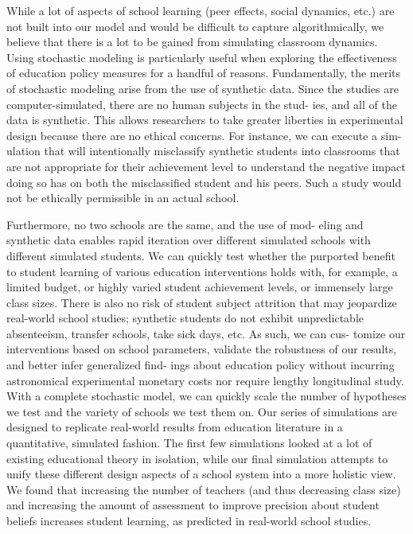 \documentclass[10pt, letterpaper]{article}
\begin{document}
While a lot of aspects of school learning (peer effects, social
dynamics, etc.) are not built into our model and would be difficult to
capture algorithmically, we believe that there is a lot to be gained
from simulating classroom dynamics. Using stochastic modeling is
particularly useful when exploring the effectiveness of education policy
measures for a handful of reasons. Fundamentally, the merits of
stochastic modeling arise from the use of synthetic data. Since the
studies are computer-simulated, there are no human subjects in the stud-
ies, and all of the data is synthetic. This allows researchers to take
greater liberties in experimental design because there are no ethical
concerns. For instance, we can execute a sim- ulation that will
intentionally misclassify synthetic students into classrooms that are
not appropriate for their achievement level to understand the negative
impact doing so has on both the misclassified student and his peers.
Such a study would not be ethically permissible in an actual school.

Furthermore, no two schools are the same, and the use of mod- eling and
synthetic data enables rapid iteration over different simulated schools
with different simulated students. We can quickly test whether the
purported benefit to student learning of various education interventions
holds with, for example, a limited budget, or highly varied student
achievement levels, or immensely large class sizes. There is also no
risk of student subject attrition that may jeopardize real-world school
studies; synthetic students do not exhibit unpredictable absenteeism,
transfer schools, take sick days, etc. As such, we can cus- tomize our
interventions based on school parameters, validate the robustness of our
results, and better infer generalized find- ings about education policy
without incurring astronomical experimental monetary costs nor require
lengthy longitudinal study. With a complete stochastic model, we can
quickly scale the number of hypotheses we test and the variety of
schools we test them on. Our series of simulations are designed to
replicate real-world results from education literature in a
quantitative, simulated fashion. The first few simulations looked at a
lot of existing educational theory in isolation, while our final
simulation attempts to unify these different design aspects of a school
system into a more holistic view. We found that increasing the number of
teachers (and thus decreasing class size) and increasing the amount of
assessment to improve precision about student beliefs increases student
learning, as predicted in real-world school studies.
\end{document}
